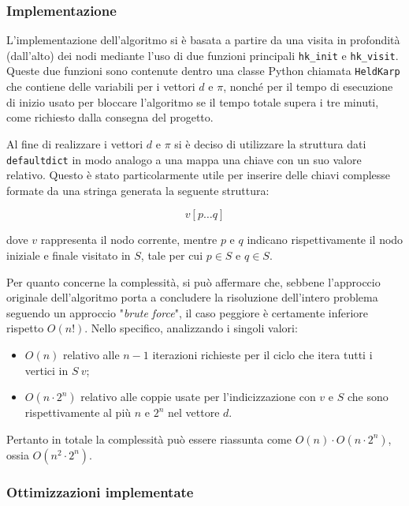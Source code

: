 \subsubsection{Implementazione}

L'implementazione dell'algoritmo si è basata a partire da una visita in profondità (dall'alto) dei nodi mediante l'uso di due funzioni principali \texttt{hk\_init} e \texttt{hk\_visit}. Queste due funzioni sono contenute dentro una classe Python chiamata \texttt{HeldKarp} che contiene delle variabili per i vettori \(d\) e \(\pi\), nonché per il tempo di esecuzione di inizio usato per bloccare l'algoritmo se il tempo totale supera i tre minuti, come richiesto dalla consegna del progetto.

Al fine di realizzare i vettori \(d\) e \(\pi\) si è deciso di utilizzare la struttura dati \texttt{defaultdict} in modo analogo a una mappa una chiave con un suo valore relativo. Questo è stato particolarmente utile per inserire delle chiavi complesse formate da una stringa generata la seguente struttura: 

\[ v [ p \dots q ]\]

dove \(v\) rappresenta il nodo corrente, mentre \(p\) e \(q\) indicano rispettivamente il nodo iniziale e finale visitato in \(S\), tale per cui \(p \in S\) e \(q \in S\).

Per quanto concerne la complessità, si può affermare che, sebbene l'approccio originale dell'algoritmo porta a concludere la risoluzione dell'intero problema seguendo un approccio "\textit{brute force}", il caso peggiore è certamente inferiore rispetto \(O(n!)\). 
Nello specifico, analizzando i singoli valori:

\begin{itemize}
    \item \(O(n)\) relativo alle \(n-1\) iterazioni richieste per il ciclo che itera tutti i vertici in \(S \ {v}\);
    \item \(O(n\cdot2^n)\) relativo alle coppie usate per l'indicizzazione con \(v\) e \(S\) che sono rispettivamente al più \(n\) e \(2^n\) nel vettore \(d\).
\end{itemize}
Pertanto in totale la complessità può essere riassunta come \(O(n) \cdot O(n\cdot2^n)\), ossia \(O(n^2\cdot2^n)\).

\subsubsection{Ottimizzazioni implementate}

